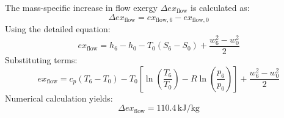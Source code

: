 The mass-specific increase in flow exergy \( \Delta ex_{\text{flow}} \) is calculated as:  
\[
\Delta ex_{\text{flow}} = ex_{\text{flow},6} - ex_{\text{flow},0}
\]  
Using the detailed equation:  
\[
ex_{\text{flow}} = h_6 - h_0 - T_0(S_6 - S_0) + \frac{w_6^2 - w_0^2}{2}
\]  
Substituting terms:  
\[
ex_{\text{flow}} = c_p(T_6 - T_0) - T_0 \left[ \ln\left(\frac{T_6}{T_0}\right) - R \ln\left(\frac{p_6}{p_0}\right) \right] + \frac{w_6^2 - w_0^2}{2}
\]  
Numerical calculation yields:  
\[
\Delta ex_{\text{flow}} = 110.4 \, \text{kJ/kg}
\]